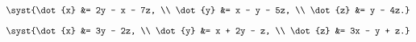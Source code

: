 \begin{multicols}{3}
\begin{enumtasks}
			\item \( \syst{\dot{x} &= 2y - x - 7z, \\ \dot{y} &= x - y - 5z, \\ \dot{z} &= y - 4z.} \) %
			\item \( \syst{\dot{x} &= 3y - 2z, \\ \dot{y} &= x + 2y - z, \\ \dot{z} &= 3x - y + z.} \) %

\end{enumtasks}
\end{multicols}
